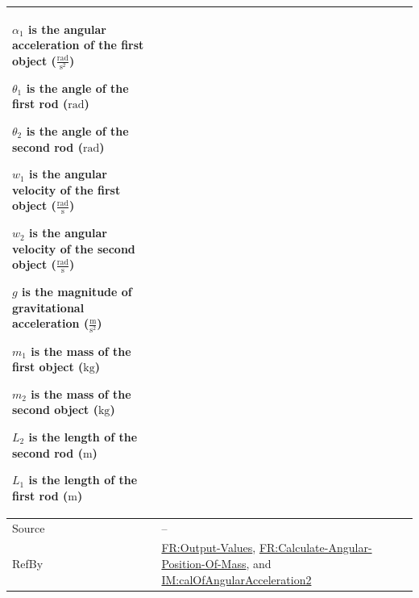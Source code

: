 \documentclass[12pt]{article}
\begin{document}
\begin{minipage}{\textwidth}
\begin{tabular}{>{\raggedright}p{}>{\raggedright\arraybackslash}p{}}
\begin{symbDescription}
              \item{${α_{1}}$ is the angular acceleration of the first object ($\frac{\text{rad}}{\text{s}^{2}}$)}
              \item{${θ_{1}}$ is the angle of the first rod (${\text{rad}}$)}
              \item{${θ_{2}}$ is the angle of the second rod (${\text{rad}}$)}
              \item{${w_{1}}$ is the angular velocity of the first object ($\frac{\text{rad}}{\text{s}}$)}
              \item{${w_{2}}$ is the angular velocity of the second object ($\frac{\text{rad}}{\text{s}}$)}
              \item{$g$ is the magnitude of gravitational acceleration ($\frac{\text{m}}{\text{s}^{2}}$)}
              \item{${m_{1}}$ is the mass of the first object (${\text{kg}}$)}
              \item{${m_{2}}$ is the mass of the second object (${\text{kg}}$)}
              \item{${L_{2}}$ is the length of the second rod (${\text{m}}$)}
              \item{${L_{1}}$ is the length of the first rod (${\text{m}}$)}
              \end{symbDescription}
\\ \midrule
Source & --
         
\\ \midrule
RefBy & \hyperref[outputValues]{FR:Output-Values}, \hyperref[calcAngPos]{FR:Calculate-Angular-Position-Of-Mass}, and \hyperref[IM:calOfAngularAcceleration2]{IM:calOfAngularAcceleration2}
        
\\ \bottomrule
\end{tabular}
\end{minipage}
\end{document}
